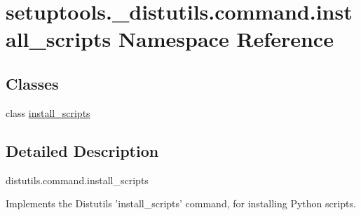 \hypertarget{namespacesetuptools_1_1__distutils_1_1command_1_1install__scripts}{}\section{setuptools.\+\_\+distutils.\+command.\+install\+\_\+scripts Namespace Reference}
\label{namespacesetuptools_1_1__distutils_1_1command_1_1install__scripts}
\subsection*{Classes}
\begin{DoxyCompactItemize}
\item 
class \hyperlink{classsetuptools_1_1__distutils_1_1command_1_1install__scripts_1_1install__scripts}{install\+\_\+scripts}
\end{DoxyCompactItemize}


\subsection{Detailed Description}
\begin{DoxyVerb}distutils.command.install_scripts

Implements the Distutils 'install_scripts' command, for installing
Python scripts.\end{DoxyVerb}
 